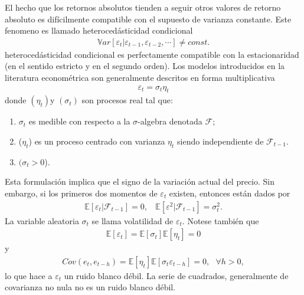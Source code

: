 \documentclass[a4paper, 11pt]{article}
\begin{document}
El hecho que los retornos absolutos tienden a seguir otros valores de retorno absoluto es difícilmente compatible con el supuesto de varianza constante. Este fenomeno es llamado heterocedásticidad condicional
\begin{align*}
  \mathbb{V}ar[\varepsilon_t | \varepsilon_{t-1},\varepsilon_{t-2},\cdots] \neq const.
\end{align*}
heterocedásticidad condicional es perfectamente compatible con la estacionaridad (en el sentido estricto y en el segundo orden).
Los modelos introducidos en la literatura econométrica son generalmente descritos en forma multiplicativa
\begin{align*}
  \varepsilon_t = \sigma_t \eta_t   
\end{align*}
donde $(\eta_t) $y $(\sigma_t)$ son procesos real tal que:
\begin{enumerate}
  \item $\sigma_t$ es medible con respecto a la $\sigma$-algebra denotada $\mathcal{F}$;
  \item ($\eta_t$) es un proceso centrado con varianza $\eta_t$ siendo independiente de $\mathcal{F}_{t-1}$.
  \item $(\sigma_t>0$).
\end{enumerate}
Esta formulación implica que el signo de la variación actual del precio. Sin embargo, si los primeros dos momentos de $\varepsilon_t$ existen, entonces están dados por 
\begin{align*}
  \mathbb{E}\left [\varepsilon_t|\mathcal{F}_{t-1}\right ] = 0, \:\:\:\: \mathbb{E}\left [\varepsilon^2 | \mathcal{F}_{t-1}     \right ] = \sigma_t^2.
\end{align*}
La variable aleatoria $\sigma_t$ se llama volatilidad de $\varepsilon_t$.
Notese también que
\begin{align*}
  \mathbb{E}\left [\varepsilon_t  \right ]  = \mathbb{E}\left [\sigma_t \right ]\mathbb{E}\left [\eta_t \right ] = 0
\end{align*}
y 
\begin{align*}
  Cov(e_t,e_{t-h }) = \mathbb{E}\left [\eta_t\right ]\mathbb{E}\left [\sigma_t \varepsilon_{t-h}\right ] = 0, \:\:\: \forall h >0,
\end{align*}
lo que hace a $\varepsilon_t $ un ruido blanco débil. La serie de cuadrados, generalmente de covarianza no nula no es un ruido blanco débil.

\end{document}
